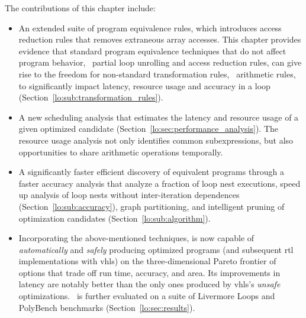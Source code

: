 The contributions of this chapter include:
\begin{itemize}

    \item An extended suite of program equivalence rules, which introduces
    access reduction rules that removes extraneous array accesses.
    This chapter provides evidence that standard program equivalence
    techniques that do not affect program behavior, \eg~partial loop
    unrolling and access reduction rules, can give rise to the freedom
    for non-standard transformation rules, \eg~arithmetic rules, to
    significantly impact latency, resource usage and accuracy in a loop
    (Section~\ref{lo:sub:transformation_rules}).

    \item A new scheduling analysis that estimates the
    latency and resource usage of a given optimized candidate
    (Section~\ref{lo:sec:performance_analysis}).  The resource usage analysis
    not only identifies common subexpressions, but also opportunities to share
    arithmetic operations temporally.

    \item A significantly faster efficient discovery of equivalent
    programs through a faster accuracy analysis that analyze a fraction
    of loop nest executions, speed up analysis of loop nests without
    inter-iteration dependences (Section~\ref{lo:sub:accuracy}), graph
    partitioning, and intelligent pruning of optimization candidates
    (Section~\ref{lo:sub:algorithm}).

    \item Incorporating the above-mentioned techniques, \soap{} is now
    capable of \emph{automatically} and \emph{safely} producing optimized
    programs (and subsequent \gls{rtl} implementations with \gls{vhls}) on
    the three-dimensional Pareto frontier of options that trade off run time,
    accuracy, and area.  Its improvements in latency are notably better than
    the only ones produced by \gls{vhls}'s \emph{unsafe} optimizations.
    \soap~is further evaluated on a suite of Livermore Loops and PolyBench
    benchmarks (Section~\ref{lo:sec:results}).

\end{itemize}

